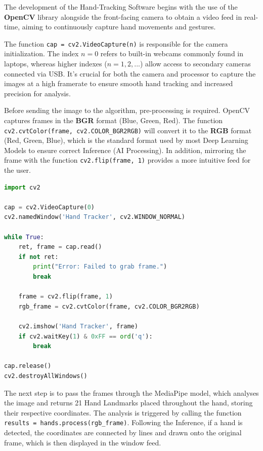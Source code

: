 The development of the Hand-Tracking Software begins with the use of the \textbf{OpenCV} library alongside the front-facing camera to obtain a video feed in real-time, aiming to continuously capture hand movements and gestures.

The function \verb|cap = cv2.VideoCapture(n)| is responsible for the camera initialization. The index $n=0$ refers to built-in webcams commonly found in laptops, whereas higher indexes ($n=1,2,...$) allow access to secondary cameras connected via USB. It's crucial for both the camera and processor to capture the images at a high framerate to ensure smooth hand tracking and increased precision for analysis.

Before sending the image to the algorithm, pre-processing is required. OpenCV captures frames in the \textbf{BGR} format (Blue, Green, Red). The function \verb|cv2.cvtColor(frame, cv2.COLOR_BGR2RGB)| will convert it to the \textbf{RGB} format (Red, Green, Blue), which is the standard format used by most Deep Learning Models to ensure correct Inference (AI Processing). In addition, mirroring the frame with the function \verb|cv2.flip(frame, 1)| provides a more intuitive feed for the user.

\begin{lstlisting}[title={Basic Camera Feed using OpenCV}, language=Python, captionpos=b]
import cv2

cap = cv2.VideoCapture(0)
cv2.namedWindow('Hand Tracker', cv2.WINDOW_NORMAL)

while True:
    ret, frame = cap.read()
    if not ret:
        print("Error: Failed to grab frame.")
        break
 
    frame = cv2.flip(frame, 1)
    rgb_frame = cv2.cvtColor(frame, cv2.COLOR_BGR2RGB)

    cv2.imshow('Hand Tracker', frame)
    if cv2.waitKey(1) & 0xFF == ord('q'):
        break

cap.release()
cv2.destroyAllWindows()
\end{lstlisting}

The next step is to pass the frames through the MediaPipe model, which analyses the image and returns 21 Hand Landmarks placed throughout the hand, storing their respective coordinates. The analysis is triggered by calling the function \verb|results = hands.process(rgb_frame)|. Following the Inference, if a hand is detected, the coordinates are connected by lines and drawn onto the original frame, which is then displayed in the window feed.

